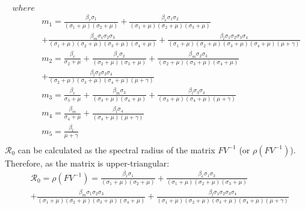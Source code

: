 \begin{align*}
where \\
&m_1 = \frac{\beta_r \sigma_{1}}{{\left(\sigma_{1} + \mu\right)} {\left(\sigma_{2} + \mu\right)}} + \frac{\beta_e \sigma_{1} \sigma_{2}}{{\left(\sigma_{1} + \mu\right)} {\left(\sigma_{2} + \mu\right)} {\left(\sigma_{3} + \mu\right)}} \\ 
&+ \frac{\beta_m \sigma_{1} \sigma_{2} \sigma_{3}}{{\left(\sigma_{1} + \mu\right)} {\left(\sigma_{2} + \mu\right)} {\left(\sigma_{3} + \mu\right)} {\left(\sigma_{4} + \mu\right)}} + \frac{\beta_l \sigma_{1} \sigma_{2} \sigma_{3} \sigma_{4}}{{\left(\sigma_{1} + \mu\right)} {\left(\sigma_{2} + \mu\right)} {\left(\sigma_{3} + \mu\right)} {\left(\sigma_{4} + \mu\right)} {\left(\mu + \gamma\right)}} \\
&m_2= \frac{\beta_r}{\sigma_{2} + \mu} + \frac{\beta_e \sigma_{2}}{{\left(\sigma_{2} + \mu\right)} {\left(\sigma_{3} + \mu\right)}} + \frac{\beta_m \sigma_{2} \sigma_{3}}{{\left(\sigma_{2} + \mu\right)} {\left(\sigma_{3} + \mu\right)} {\left(\sigma_{4} + \mu\right)}} \\ & + \frac{\beta_l \sigma_{2} \sigma_{3} \sigma_{4}}{{\left(\sigma_{2} + \mu\right)} {\left(\sigma_{3} + \mu\right)} {\left(\sigma_{4} + \mu\right)} {\left(\mu + \gamma\right)}} \\
&m_3= \frac{\beta_e}{\sigma_{3} + \mu} + \frac{\beta_m \sigma_{3}}{{\left(\sigma_{3} + \mu\right)} {\left(\sigma_{4} + \mu\right)}} + \frac{\beta_l \sigma_{3} \sigma_{4}}{{\left(\sigma_{3} + \mu\right)} {\left(\sigma_{4} + \mu\right)} {\left(\mu + \gamma\right)}} \\
&m_4= \frac{\beta_m}{\sigma_{4} + \mu} + \frac{\beta_l \sigma_{4}}{{\left(\sigma_{4} + \mu\right)} {\left(\mu + \gamma\right)}} \\
&m_5= \frac{\beta_l}{\mu + \gamma} \\
\end{align*}
$\mathcal R_0$ can be calculated as the spectral radius of the matrix $FV^{-1}$ (or $\rho(FV^{-1})$). Therefore, as the matrix is upper-triangular:
\begin{align*}
&\mathcal R_0 = \rho(FV^{-1}) = \frac{\beta_r \sigma_{1}}{{\left(\sigma_{1} + \mu\right)} {\left(\sigma_{2} + \mu\right)}} + \frac{\beta_e \sigma_{1} \sigma_{2}}{{\left(\sigma_{1} + \mu\right)} {\left(\sigma_{2} + \mu\right)} {\left(\sigma_{3} + \mu\right)}} \\ 
&+ \frac{\beta_m \sigma_{1} \sigma_{2} \sigma_{3}}{{\left(\sigma_{1} + \mu\right)} {\left(\sigma_{2} + \mu\right)} {\left(\sigma_{3} + \mu\right)} {\left(\sigma_{4} + \mu\right)}} + \frac{\beta_l \sigma_{1} \sigma_{2} \sigma_{3} \sigma_{4}}{{\left(\sigma_{1} + \mu\right)} {\left(\sigma_{2} + \mu\right)} {\left(\sigma_{3} + \mu\right)} {\left(\sigma_{4} + \mu\right)} {\left(\mu + \gamma\right)}}
\end{align*}
